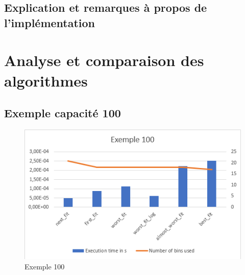 \documentclass{article}
\begin{document}
\subsection{Explication et remarques à propos de l'implémentation}


\section{Analyse et comparaison des algorithmes}
\subsection{Exemple capacité 100}
\begin{figure}[h]
\begin{center}
\includegraphics{exemple100.png}
\end{center}
\caption{Exemple 100}
\end{figure}
\end{document}
